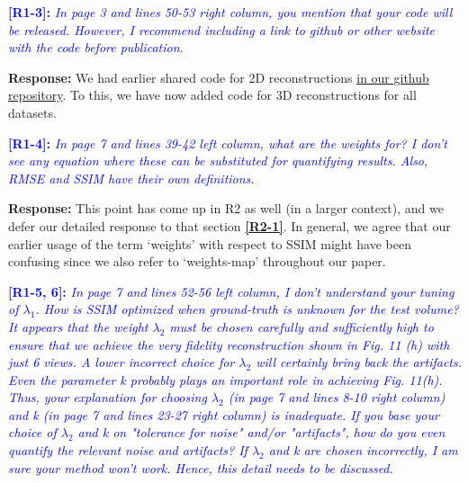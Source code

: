 \documentclass[11pt]{article}
\begin{document}
  \vspace{0.5cm}\textcolor{blue}{\textbf{[R1-3]:} \textit{In page 3 and lines 50-53
      right column, you mention that your code will be
      released. However, I recommend including a link to github or
      other website with the code before publication.}} 

  \textbf{Response:} We had earlier shared code for 2D reconstructions
  \href{https://github.com/preetigopal/Weighted-Prior-Tomographic-Reconstruction}{in
    our github repository}. To this, we have now added code for 3D
  reconstructions for all datasets.

  \vspace{0.5cm}\textcolor{blue}{\textbf{[R1-4]:} \textit{In page 7 and lines 39-42
      left column, what are the weights for? I don't see any equation
      where these can be substituted for quantifying results. Also,
      RMSE and \hypertarget{ssim-R1}{SSIM have their own definitions}.}}

  \textbf{Response:} This point has come up in R2 as well (in a larger
  context), and we defer our detailed response to that section \textcolor{blue}{\textbf{\hyperlink{ssim}{[R2-1]}}}. In
  general, we agree that our earlier usage of the term `weights' with
  respect to SSIM might have been confusing since we also refer to
  `weights-map' throughout our paper.
  

  \vspace{0.5cm}\textcolor{blue}{\textbf{\hypertarget{hyperparameters}{[R1-5, 6]:}} \textit{In
      page 7 and lines 52-56 left column, I don't understand your
      tuning of $\lambda_1$. How is SSIM optimized when ground-truth
      is unknown for the test volume?  It appears that the weight
      $\lambda_2$ must be chosen carefully and sufficiently high to
      ensure that we achieve the very fidelity reconstruction shown in
      Fig. 11 (h) with just 6 views. A lower incorrect choice for
      $\lambda_2$ will certainly bring back the artifacts. Even the
      parameter k probably plays an important role in achieving
      Fig. 11(h). Thus, your explanation for choosing $\lambda_2$ (in
      page 7 and lines 8-10 right column) and k (in page 7 and lines
      23-27 right column) is inadequate. If you base your choice of
      $\lambda_2$ and k on "tolerance for noise" and/or "artifacts",
      how do you even quantify the relevant noise and artifacts? If
      $\lambda_2$ and k are chosen incorrectly, I am sure your method
      won't work. Hence, this detail needs to be discussed.}}
\end{document}
